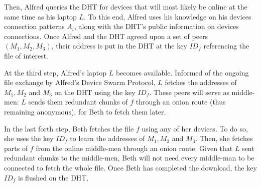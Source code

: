 Then, Alfred queries the DHT for devices that will most likely be online at the same time as his laptop $L$.
To this end, Alfred uses his knowledge on his devices connection patterns $A_i$, along with the DHT's public information on devices connections.
Once Alfred and the DHT agreed upon a set of peers $(M_1, M_2, M_3)$, their address is put in the DHT at the key $ID_f$ referencing the file of interest.

At the third step, Alfred's laptop $L$ becomes available. 
Informed of the ongoing file exchange by Alfred's Device Swarm Protocol, $L$ fetches the addresses of $M_1, M_2$ and $M_3$ on the DHT using the key $ID_f$.
These peers will serve as middle-men: $L$ sends them redundant chunks of $f$ through an onion route (thus remaining anonymous), for Beth to fetch them later.

In the last forth step, Beth fetches the file $f$ using any of her devices.
To do so, she uses the key $ID_f$ to learn the addresses of $M_1, M_2$ and $M_3$.
Then, she fetches parts of $f$ from the online middle-men through an onion route.
Given that $L$ sent redundant chunks to the middle-men, Beth will not need every middle-man to be connected to fetch the whole file.
Once Beth has completed the download, the key $ID_f$ is flushed on the DHT.


